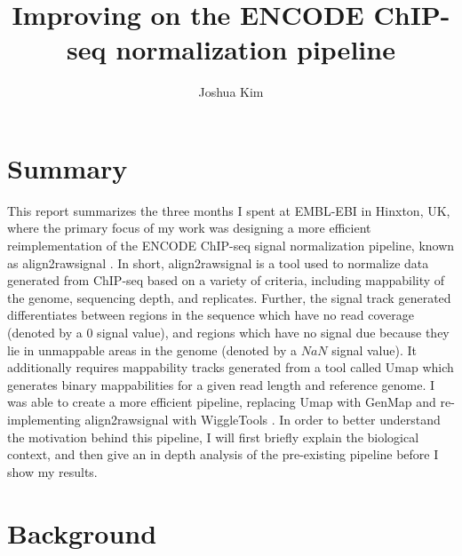 \documentclass[a4paper]{article}
\title{Improving on the ENCODE ChIP-seq normalization pipeline}
\author{Joshua Kim}
\begin{document}
  \maketitle
  \newpage
  \tableofcontents
  \newpage
  \section{Summary}
  This report summarizes the three months I spent at EMBL-EBI in Hinxton, UK, where the primary focus of my work was
  designing a more efficient reimplementation of the ENCODE ChIP-seq signal normalization pipeline, known as
  align2rawsignal \cite{hoffman_integrative_2013}. In short, align2rawsignal is a tool used to
  normalize data generated from ChIP-seq based on a variety of criteria, including mappability of the genome, sequencing depth,
  and replicates. Further, the signal track generated differentiates between regions in the sequence which have no
  read coverage (denoted by a $0$ signal value), and regions which have no signal due because they lie in unmappable areas
  in the genome (denoted by a $NaN$ signal value). It additionally requires mappability tracks generated from a tool
  called Umap \cite{karimzadeh_umap_2018} which generates binary mappabilities for a given read length and reference genome. I was able to
  create a more efficient pipeline, replacing Umap with GenMap \cite{pockrandt_genmap:_2019} and re-implementing align2rawsignal with
  WiggleTools \cite{zerbino_wiggletools:_2014}. In order to better understand the motivation behind this pipeline, I will first briefly explain the
  biological context, and then give an in depth analysis of the pre-existing pipeline before I show my results.

  \section{Background}
\end{document}
